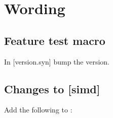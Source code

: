 \section{Wording}\label{sec:wording}
\subsection{Feature test macro}

In [version.syn] bump the  version.

\subsection{Changes to {[simd]}}
\def\rSec#1[#2]#3{%
  \ifcase#1\wgSubsection[subsection]{#3}{#2}
  \or\wgSubsection[subsection]{#3}{#2}
  \or\wgSubsubsection[subsubsection]{#3}{#2}
  \or\wgSubsubsubsection[paragraph]{#3}{#2}
  \or\error
\fi}

Add the following to :

